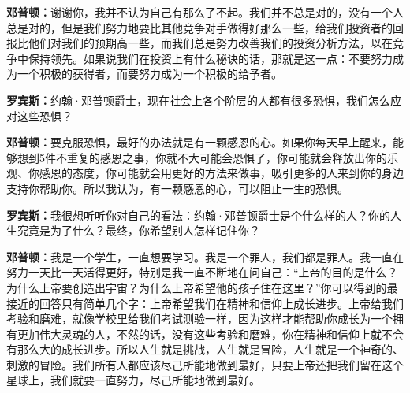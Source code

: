 \begin{BookQuote}
\textbf{邓普顿：}谢谢你，我并不认为自己有那么了不起。我们并不总是对的，没有一个人总是对的，但是我们努力地要比其他竞争对手做得好那么一些，给我们投资者的回报比他们对我们的预期高一些，而我们总是努力改善我们的投资分析方法，以在竞争中保持领先。如果说我们在投资上有什么秘诀的话，那就是这一点：不要努力成为一个积极的获得者，而要努力成为一个积极的给予者。
\end{BookQuote}

\begin{BookQuote}
\textbf{罗宾斯：}约翰·邓普顿爵士，现在社会上各个阶层的人都有很多恐惧，我们怎么应对这些恐惧？
\end{BookQuote}

\begin{BookQuote}
\textbf{邓普顿：}要克服恐惧，最好的办法就是有一颗感恩的心。如果你每天早上醒来，能够想到5件不重复的感恩之事，你就不大可能会恐惧了，你可能就会释放出你的乐观、你感恩的态度，你可能就会用更好的方法来做事，吸引更多的人来到你的身边支持你帮助你。所以我认为，有一颗感恩的心，可以阻止一生的恐惧。
\end{BookQuote}

\begin{BookQuote}
\textbf{罗宾斯：}我很想听听你对自己的看法：约翰·邓普顿爵士是个什么样的人？你的人生究竟是为了什么？最终，你希望别人怎样记住你？
\end{BookQuote}

\begin{BookQuote}
\textbf{邓普顿：}我是一个学生，一直想要学习。我是一个罪人，我们都是罪人。我一直在努力一天比一天活得更好，特别是我一直不断地在问自己：“上帝的目的是什么？为什么上帝要创造出宇宙？为什么上帝希望他的孩子住在这里？”你可以得到的最接近的回答只有简单几个字：上帝希望我们在精神和信仰上成长进步。上帝给我们考验和磨难，就像学校里给我们考试测验一样，因为这样才能帮助你成长为一个拥有更加伟大灵魂的人，不然的话，没有这些考验和磨难，你在精神和信仰上就不会有那么大的成长进步。所以人生就是挑战，人生就是冒险，人生就是一个神奇的、刺激的冒险。我们所有人都应该尽己所能地做到最好，只要上帝还把我们留在这个星球上，我们就要一直努力，尽己所能地做到最好。
\end{BookQuote}
